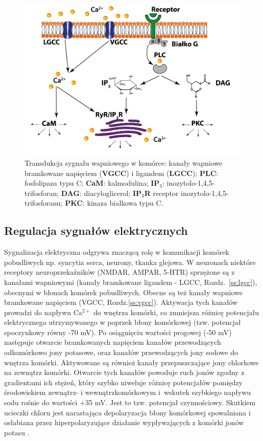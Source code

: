 \begin{figure}[tb]
\centering
\includegraphics[width=0.99\textwidth]{rysunki/rozdzial_1/transdukcja.png}
\caption[Transdukcja sygnału wapniowego]{Transdukcja sygnału wapniowego w komórce: kanały wapniowe bramkowane napięciem (\textbf{VGCC}) i ligandem (\textbf{LGCC}); \textbf{PLC}: fosfolipaza typu C; \textbf{CaM}: kalmodulina; \textbf{IP$_3$}: inozytolo-1,4,5-trifosforan; \textbf{DAG}: diacyloglicerol; \textbf{IP$_3$R} receptor inozytolo-1,4,5-trifosforanu; \textbf{PKC}: kinaza białkowa typu C.}
\label{fig:transdukcja}
\end{figure}

\subsection{Regulacja sygnałów elektrycznych}
Sygnalizacja elektryczna odgrywa znaczącą rolę w komunikacji komórek pobudliwych np. syncytia serca, neurony, tkanka glejowa. W neuronach niektóre receptory neuroprzekaźników (NMDAR, AMPAR, 5-HTR) sprzężone są z kanałami wapniowymi (kanały bramkowane ligandem - LGCC, Rozdz.~\ref{ss:lgcc}), obecnymi w błonach komórek pobudliwych. Obecne są też kanały wapniowe bramkowane napięciem (VGCC, Rozdz.\ref{ss:vgcc}). Aktywacja tych kanałów prowadzi do napływu Ca$^{2+}$ do wnętrza komórki, co zmniejsza różnicę potencjału elektrycznego utrzymywanego w poprzek błony komórkowej (tzw. potencjał spoczynkowy równy -70 mV). Po osiągnięciu wartości progowej (-50 mV) następuje otwarcie bramkowanych napięciem kanałów przewodzących odkomórkowo jony potasowe, oraz kanałów przewodzących jony sodowe do wnętrza komórki. Aktywowane są również kanały przepuszczające jony chlorkowe na zewnątrz komórki. Otwarcie tych kanałów powoduje ruch jonów zgodny z gradientami ich stężeń, który szybko niweluje różnicę potencjałów pomiędzy środowiskiem zewnątrz- i wewnątrzkomórkowym i~wskutek szybkiego napływu sodu rośnie do wartości +35 mV. Jest to tzw. potencjał czynnościowy. Skutkiem ucieczki chloru jest narastająca depolaryzacja błony komórkowej spowalniana i osłabiana przez hiperpolaryzujące działanie wypływających z komórki jonów potasu \cite{Bear2007,Traczyk2007}.

